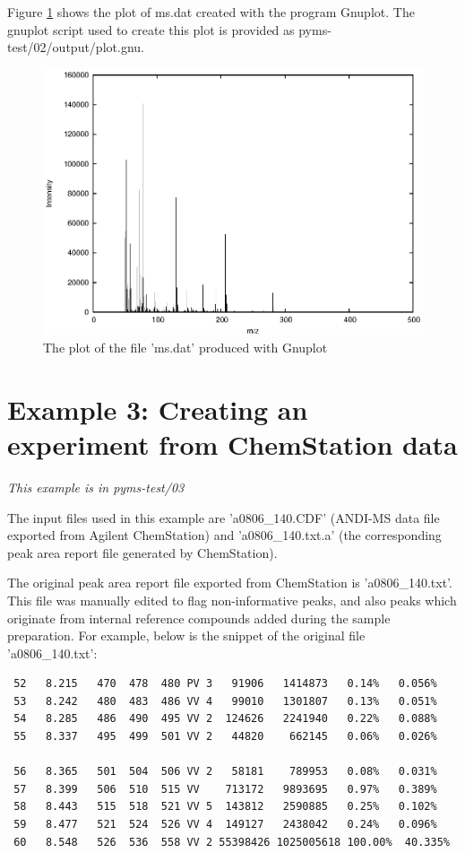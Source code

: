 Figure \ref{mass-spectrum} shows the plot of ms.dat created with the
program Gnuplot. The gnuplot script used to create this plot is
provided as pyms-test/02/output/plot.gnu.

\begin{figure}[htp]
\begin{center}
\includegraphics{graphics/ms.eps}
\caption{The plot of the file 'ms.dat' produced with Gnuplot}
\label{mass-spectrum}
\end{center}
\end{figure}

\section{Example 3: Creating an experiment from ChemStation data}

\noindent
{\em This example is in pyms-test/03}

The input files used in this example are 'a0806\_140.CDF' (ANDI-MS data
file exported from Agilent ChemStation) and 'a0806\_140.txt.a' (the 
corresponding peak area report file generated by ChemStation).

The original peak area report file exported from ChemStation is
'a0806\_140.txt'. This file was manually edited to flag non-informative
peaks, and also peaks which originate from internal reference compounds
added during the sample preparation. For example, below is the snippet
of the original file 'a0806\_140.txt':

\begin{verbatim}
 52   8.215   470  478  480 PV 3   91906   1414873   0.14%   0.056%
 53   8.242   480  483  486 VV 4   99010   1301807   0.13%   0.051%
 54   8.285   486  490  495 VV 2  124626   2241940   0.22%   0.088%
 55   8.337   495  499  501 VV 2   44820    662145   0.06%   0.026%
 
 56   8.365   501  504  506 VV 2   58181    789953   0.08%   0.031%
 57   8.399   506  510  515 VV    713172   9893695   0.97%   0.389%
 58   8.443   515  518  521 VV 5  143812   2590885   0.25%   0.102%
 59   8.477   521  524  526 VV 4  149127   2438042   0.24%   0.096%
 60   8.548   526  536  558 VV 2 55398426 1025005618 100.00%  40.335%
\end{verbatim}

